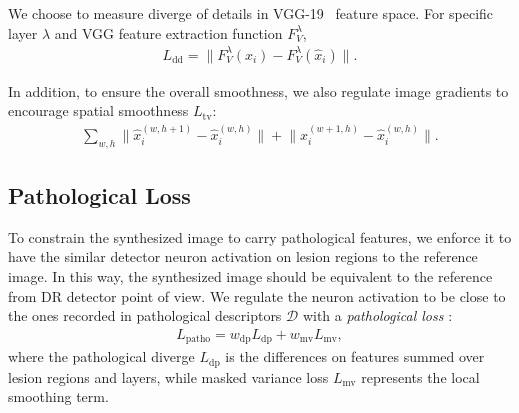 \documentclass[letterpaper]{article} %
\begin{document}
		We choose to measure diverge of details in VGG-19~\cite{DBLP:journals/corr/SimonyanZ14a} feature space. For specific layer $ \lambda $ and VGG feature extraction function $ F_V^\lambda $,
	\begin{align}
	\label{align_dd_loss}
	L_\mathrm{dd} =  {\lVert F_V^\lambda(x_i) - F_V^\lambda(\hat x_i) \lVert}.
	\end{align}

	In addition, to ensure the overall smoothness, we also regulate image gradients to encourage spatial smoothness $L_\mathrm{tv}$:
	\begin{align}
	\label{align_tv_loss} \textstyle
	\sum_{w,h}{\lVert \hat{x}_i^{(w,h+1)} - \hat{x}_i^{(w,h)} \lVert}
	+ {\lVert \hat{x}_i^{(w+1,h)} - \hat{x}_i^{(w,h)} \lVert}.
	\end{align}

	\subsection{Pathological Loss}

   To constrain the synthesized image to carry pathological features, we enforce it to have the similar detector neuron activation on lesion regions to the reference image. In this way, the synthesized image should be equivalent to the reference from DR detector point of view. We regulate the neuron activation to be close to the ones recorded in pathological descriptors $ \mathcal{D} $ with a  \emph{pathological loss} :
    \begin{align}
	\label{align_patho_loss}
	L_\mathrm{patho} = w_\mathrm{dp} L_\mathrm{dp} + w_\mathrm{mv} L_\mathrm{mv},
	\end{align}
	where the pathological diverge $L_\mathrm{dp}$ is the differences on features summed over lesion regions and layers, while masked variance loss $L_\mathrm{mv}$ represents the local smoothing term.
\end{document}
